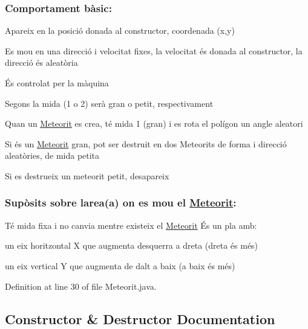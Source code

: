 \subsubsection*{Comportament bàsic\+: }

Apareix en la posició donada al constructor, coordenada (x,y)
\begin{DoxyItemize}
\item Es mou en una direcció i velocitat fixes, la velocitat és donada al constructor, la direcció és aleatòria
\item És controlat per la màquina
\item Segons la mida (1 o 2) serà gran o petit, respectivament
\item Quan un \hyperlink{class_meteorit}{Meteorit} es crea, té mida 1 (gran) i es rota el polígon un angle aleatori
\item Si és un \hyperlink{class_meteorit}{Meteorit} gran, pot ser destruit en dos Meteorits de forma i direcció aleatòries, de mida petita
\item Si es destrueix un meteorit petit, desapareix
\end{DoxyItemize}

\subsubsection*{Supòsits sobre l\textquotesingle{}area(a) on es mou el \hyperlink{class_meteorit}{Meteorit}\+: }

Té mida fixa i no canvia mentre existeix el \hyperlink{class_meteorit}{Meteorit} És un pla amb\+:
\begin{DoxyItemize}
\item un eix horitzontal X que augmenta d\textquotesingle{}esquerra a dreta (dreta és més)
\end{DoxyItemize}

un eix vertical Y que augmenta de dalt a baix (a baix és més) 

Definition at line 30 of file Meteorit.\+java.



\subsection{Constructor \& Destructor Documentation}
\hypertarget{class_meteorit_a9dcc96793a206baab2cc5aa5141a30f5}{}
